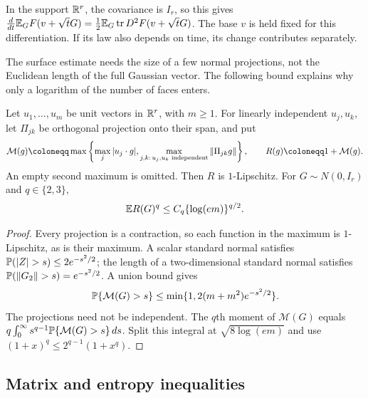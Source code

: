 In the support \(\mathbb R^r\), the covariance is \(I_r\), so this gives
\(\frac d{dt}\mathbb E_G F(v+\sqrt tG)=\frac12\mathbb E_G\operatorname{tr} D^2F(v+\sqrt tG)\).
The base \(v\) is held fixed for this differentiation. If its law also
depends on time, its change contributes separately.


The surface estimate needs the size of a few normal projections,
not the Euclidean length of the full Gaussian vector. The following
bound explains why only a logarithm of the number of faces enters.

\begin{fact}
\label{tb:projection-moments}
Let \(u_1,\ldots,u_m\) be unit vectors in \(\mathbb R^r\), with \(m\ge1\).
For linearly independent \(u_j,u_k\), let \(\Pi_{jk}\) be orthogonal
projection onto their span, and put
\[
 \mathcal M(g)\coloneqq \max\left\{\max_j|u_j\cdot g|,
   \max_{j,k:\,u_j,u_k\text{ independent}}\norm{\Pi_{jk}g}\right\},
 \qquad R(g)\coloneqq 1+\mathcal M(g).
\]
An empty second maximum is omitted. Then \(R\) is \(1\)-Lipschitz.
For \(G\sim N(0,I_r)\) and \(q\in\{2,3\}\),
\[
 \mathbb E R(G)^q\le C_q\{\log(em)\}^{q/2}.
\]
\end{fact}

\begin{proof}
Every projection is a contraction, so each function in the maximum
is \(1\)-Lipschitz, as is their maximum. A scalar standard normal
satisfies \(\Pp(|Z|>s)\le2e^{-s^2/2}\); the length of a
two-dimensional standard normal satisfies
\(\mathbb P(\left\lVert G_2\right\rVert>s)=e^{-s^2/2}\). A union bound gives
\[
 \mathbb P\{\mathcal M(G)>s\}\le\min\{1,2(m+m^2)e^{-s^2/2}\}.
\]
The projections need not be independent. The \(q\)th moment of
\(\mathcal M(G)\) equals
\(q\int_0^\infty s^{q-1}\mathbb P\{\mathcal M(G)>s\}\,ds\).
Split this integral at \(\sqrt{8\log(em)}\) and use
\((1+x)^q\le2^{q-1}(1+x^q)\).
\end{proof}


\subsection{Matrix and entropy inequalities}\label{tb:sec:matrix}

